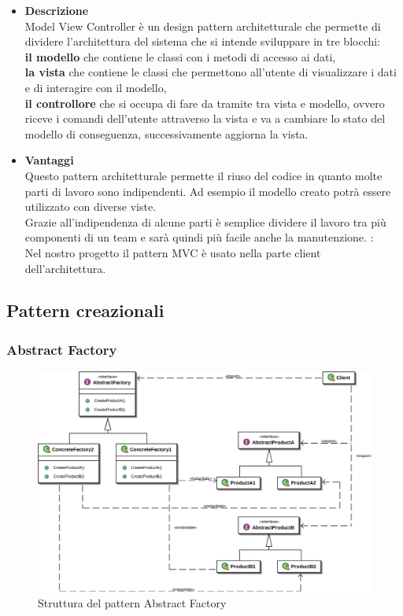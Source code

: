 		\begin{itemize}	
			\item \textbf{Descrizione} \\ Model View Controller è un design pattern architetturale che permette di dividere l'architettura del sistema che si intende sviluppare in tre blocchi: \\
			\textbf{il modello} che contiene le classi con i metodi di accesso ai dati, \\
			\textbf{la vista} che contiene le classi che permettono all'utente di visualizzare i dati e di interagire con il modello, \\
			\textbf{il controllore} che si occupa di fare da tramite tra vista e modello, ovvero riceve i comandi dell'utente attraverso la vista e va a cambiare lo stato del modello di conseguenza, successivamente aggiorna la vista. \\
			
			\item \textbf{Vantaggi} \\
			Questo pattern architetturale permette il riuso del codice in quanto molte parti di lavoro sono indipendenti. Ad esempio il modello creato potrà essere utilizzato con diverse viste. \\ Grazie all'indipendenza di alcune parti è semplice dividere il lavoro tra più componenti di un team e sarà quindi più facile anche la manutenzione.
			\utilizzo: \\
			Nel nostro progetto il pattern MVC è usato nella parte client dell'architettura. 
		\end{itemize}
		
\subsection{Pattern creazionali}
	\subsubsection{Abstract Factory}
	
	\begin{figure}[!h]
		\centering
		\includegraphics[scale=0.2]{img/abstract_factory}  
		\caption{Struttura del pattern Abstract Factory}
	\end{figure}
	
